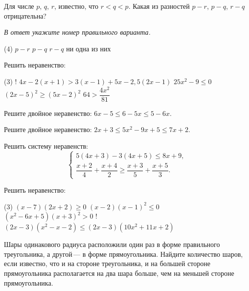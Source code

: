 %
%
\begin{class}[number=6]
	\begin{listofex}
		\item Для числе \( p \), \( q \), \( r \), известно, что \( r<q<p \). Какая из разностей \( p-r \), \( p-q \), \( r-q \) отрицательна?
		
		\textit{В ответ укажите номер правильного варианта.}
		\begin{tasks}(4)
			\task \( p-r \)
			\task \( p-q \)
			\task \( r-q \)
			\task ни одна из них
		\end{tasks}
		\item Решить неравенство:
		\begin{tasks}(3)
			\task! \( 4x-2(x+1)>3(x-1)+5x-2,5(2x-1) \)
			\task \( 25x^2-9\le0 \)
			\task \( (2x-5)^2\ge(5x-2)^2 \)
			\task \( 64>\dfrac{4x^2}{81} \)
		\end{tasks}
		\item Решите двойное неравенство: \( 6x-5\le6-5x\le5-6x \).
		\item Решите двойное неравенство: \( 2x+3\le5x^2-9x+5\le7x+2 \).
		\item Решить систему неравенств:
		\[ \left\{
		\begin{array}{l}
			5(4x+3)-3(4x+5)\le8x+9,\\
			\dfrac{x+2}{4}+\dfrac{x+4}{2}\ge\dfrac{x+3}{5}+\dfrac{x+5}{3}.
		\end{array}
		\right. \]
		\item Решить неравенство:
		\begin{tasks}(3)
			\task \( (x-7)(2x+2)\ge0 \)
			\task \( (x-2)(x-1)^2\le0 \)
			\task \( (x^2-6x+5)(x+3)^2>0 \)
			\task! \( (2x-3)(x^2-x-2)\le(2x-3)(10x^2+11x+2) \)
		\end{tasks}
		\item Шары одинакового радиуса расположили один раз в форме правильного треугольника,
		а другой --- в форме прямоугольника. Найдите количество шаров,
		если известно, что и на стороне треугольника,
		и на большей стороне прямоугольника располагается на два шара больше,
		чем на меньшей стороне прямоугольника.
	\end{listofex}
\end{class}
%
%
%
